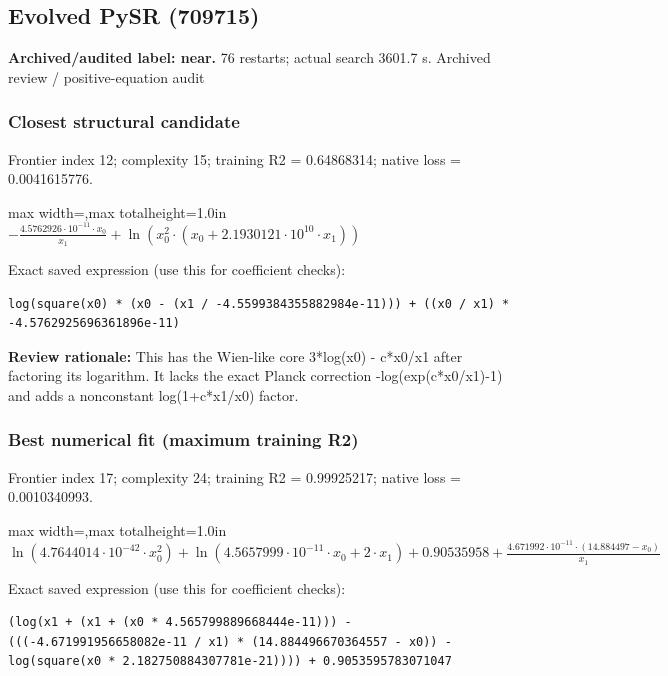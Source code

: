 \documentclass[10pt,letterpaper,landscape]{article}
\begin{document}
\begin{minipage}[t]{0.485\textwidth}
\subsection*{Evolved PySR (709715)}
\textbf{Archived/audited label: near.} 76 restarts; actual search 3601.7 s.
{\small Archived review / positive-equation audit}
\subsubsection*{Closest structural candidate}
Frontier index 12; complexity 15; training R2 = 0.64868314; native loss = 0.0041615776.
\begin{center}\begin{adjustbox}{max width=\linewidth,max totalheight=1.0in}$\displaystyle - \frac{4.5762926 \cdot 10^{-11} \cdot x_{0}}{x_{1}} + \ln{\left(x_{0}^{2} \cdot \left(x_{0} + 2.1930121 \cdot 10^{10} \cdot x_{1}\right) \right)}$\end{adjustbox}\end{center}
{\scriptsize Exact saved expression (use this for coefficient checks):}
\begin{lstlisting}
log(square(x0) * (x0 - (x1 / -4.5599384355882984e-11))) + ((x0 / x1) * -4.5762925696361896e-11)
\end{lstlisting}
{\small\textbf{Review rationale:} This has the Wien-like core 3*log(x0) - c*x0/x1 after factoring its logarithm. It lacks the exact Planck correction -log(exp(c*x0/x1)-1) and adds a nonconstant log(1+c*x1/x0) factor.}
\subsubsection*{Best numerical fit (maximum training R2)}
Frontier index 17; complexity 24; training R2 = 0.99925217; native loss = 0.0010340993.
\begin{center}\begin{adjustbox}{max width=\linewidth,max totalheight=1.0in}$\displaystyle \ln{\left(4.7644014 \cdot 10^{-42} \cdot x_{0}^{2} \right)} + \ln{\left(4.5657999 \cdot 10^{-11} \cdot x_{0} + 2 \cdot x_{1} \right)} + 0.90535958 + \frac{4.671992 \cdot 10^{-11} \cdot \left(14.884497 - x_{0}\right)}{x_{1}}$\end{adjustbox}\end{center}
{\scriptsize Exact saved expression (use this for coefficient checks):}
\begin{lstlisting}
(log(x1 + (x1 + (x0 * 4.565799889668444e-11))) - (((-4.671991956658082e-11 / x1) * (14.884496670364557 - x0)) - log(square(x0 * 2.182750884307781e-21)))) + 0.9053595783071047
\end{lstlisting}
\end{minipage}
\clearpage{}\label{planck-10004}
\end{document}
